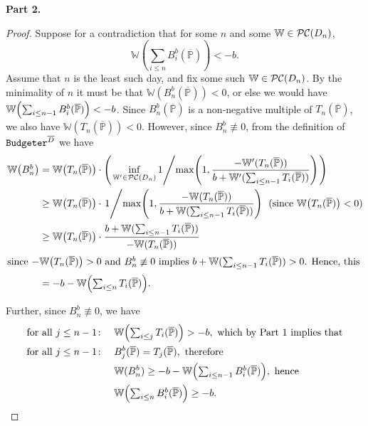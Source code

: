 \documentclass[authordate,onecolumn,noenvironments]{miri-tech-article}
\numberwithin{equation}{subsection}
\newcommand{\seq}[1]{{\overline{#1}}}
\newcommand{\nn}{n}
\newcommand{\tinysection}[1]{\medskip\noindent\textbf{#1.}}
\newcommand{\trade}{T}%
\newcommand{\budgeter}{\text{\upshape{\texttt{Budgeter}}}\xspace}
\newcommand{\BelState}{\mathbb{P}}
\newcommand{\pt}{\BelState}
\newcommand{\MP}{\seq{\pt}}
\newcommand{\dt}{D}
\newcommand{\DP}{\seq{\dt}}
\newcommand{\pcworlds}{\mathcal{P\-C}}
\newcommand{\World}{\mathbb{W}}
\begin{document}
\tinysection{Part 2}
\begin{proof}
  Suppose for a contradiction that for some $n$ and some $\World\in\pcworlds(\dt_\nn)$, 
  \[
      \World\left({\textstyle \sum_{i \leq \nn} B^b_{i}(\MP)} \right) < -b.
  \]
  Assume that $n$ is the least such day, and fix some such $\World\in\pcworlds(\dt_\nn)$. By the minimality of $n$ it must be that $\World(B^b_\nn(\MP))< 0$, or else we would have $\World\mleft({\textstyle \sum_{i \leq \nn-1}
  B^b_{i}(\MP)}\mright) < -b$. Since $B^b_\nn(\MP)$ is a non-negative multiple of $\trade_\nn(\MP)$, we also have $\World(T_\nn(\MP))< 0$.  However, since $B^b_{n}\not\equiv 0$,
  from the definition of $\budgeter^\DP$ we have
  \begin{align*}
    \World\mleft({\textstyle B^b_{n}} \mright) 
    &= 
      \World\mleft({\trade_\nn(\MP)}\mright)
      \cdot
      \left(
        \left.
        \inf_{\World'\in\pcworlds(\dt_\nn)}
        1 \middle/ \max\mleft(1, \frac{-\World'(\trade_\nn(\MP))}
                                     {b+\World'({\textstyle \sum_{i \leq \nn-1} \trade_{i}(\MP)})}
        \mright)
        \right.
      \right) \\
    &\geq 
      \World\mleft({\trade_\nn(\MP)}\mright)
      \cdot 
      \left.
      1 \middle/ \max\mleft(1, \frac{-\World(\trade_\nn(\MP))}
                                   {b+\World({\textstyle \sum_{i \leq \nn-1} \trade_{i}(\MP)})}
      \mright)
      \right.
      \text{\ (since  $\World\mleft({\trade_\nn(\MP)}\mright) <0$)}  \\
    &\geq 
      \World\mleft({\trade_\nn(\MP)}\mright)
      \cdot 
      \frac{b+\World({\textstyle \sum_{i \leq \nn-1} \trade_{i}(\MP)})}
           {-\World(\trade_\nn(\MP))}  \\
           \shortintertext{since $-\World\mleft({\trade_\nn(\MP)}\mright) >0$ and $B^b_{n}\not\equiv 0$ implies $b+\World({\textstyle \sum_{i \leq \nn-1} \trade_{i}(\MP)})>0$. Hence, this}
    &= 
      -b-\World\mleft({\textstyle \sum_{i \le \nn} \trade_{i}(\MP)} \mright).
\end{align*}

Further, since $B^b_{n}\not\equiv 0$, we have
\begin{align*}
  \text{for all\ } j \le n-1\colon\quad& 
  \World\mleft({\textstyle \sum_{i \le j}\trade_{i}(\MP)}\mright) > -b,
  \text{\ which by Part 1 implies that}\\
  \text{for all\ } j \le n-1 \colon\quad& 
  B^b_j(\MP) = \trade_j(\MP), \text{ therefore}\\
  &\World(B^b_\nn)\geq  -b-\World\mleft({\textstyle \sum_{i \le \nn-1} B^b_{i}(\MP)} \mright),\text{ hence}\\
  &\World\mleft({\textstyle \sum_{i \le n} B^b_{i}(\MP)}\mright) \geq -b.\qedhere
\end{align*}
\end{proof}
\end{document}
